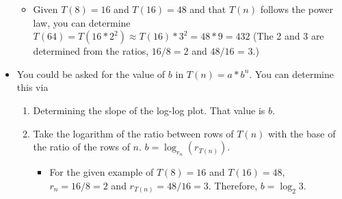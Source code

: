 \documentclass{article}
\begin{document}
\begin{itemize}
		\begin{itemize}
			\item Given $T(8) = 16$ and $T(16) = 48$ and that $T(n)$ follows the power law, you can determine $T(64) = T(16 * 2^2) \approx T(16) * 3^2 = 48 * 9 = 432$ (The 2 and 3 are determined from the ratios, $16/8 = 2$ and $48/16$ = 3.)
		\end{itemize}
	\item
		You could be asked for the value of $b$ in $T(n) = a * b^n$. You can determine this via 
		\begin{enumerate}
			\item Determining the slope of the log-log plot. That value is $b$. 
			\item Take the logarithm of the ratio between rows of $T(n)$ with the base of the ratio of the rows of $n$. $b = \log_{r_n} (r_{T(n)})$.
			\begin{itemize}
				\item For the given example of $T(8) = 16$ and $T(16) = 48$, $r_n = 16 / 8 = 2$ and $r_{T(n)} = 48 / 16 = 3$. Therefore, $b = \log_2 3$.
			\end{itemize}
		\end{enumerate}
\end{itemize}
\end{document}
